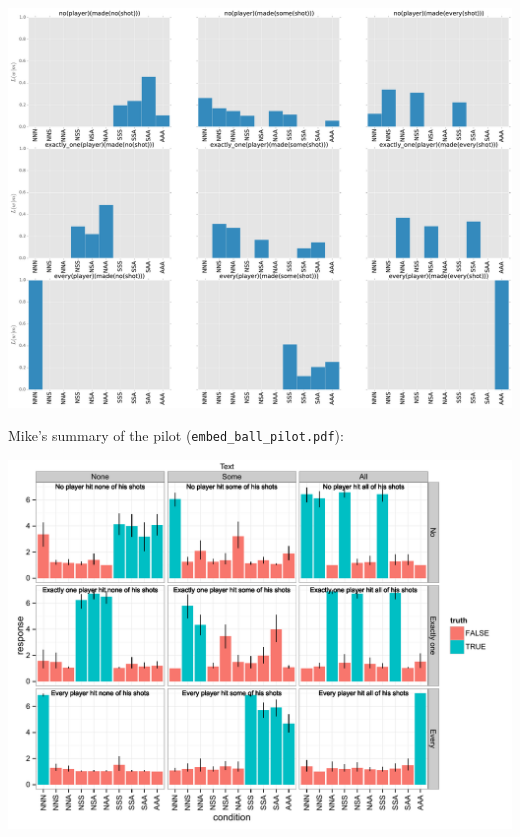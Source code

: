 \documentclass{article}
\begin{document}
\begin{examples}
\vspace{-4pt}

  \includegraphics[width=1\textwidth]{fig/example-pilot}

\vspace{-10pt}

\item Mike's summary of the pilot (\texttt{embed\_ball\_pilot.pdf}):

\vspace{-4pt}

  \includegraphics[width=1\textwidth]{fig/embed_ball_pilot}

\end{examples}
\end{document}
